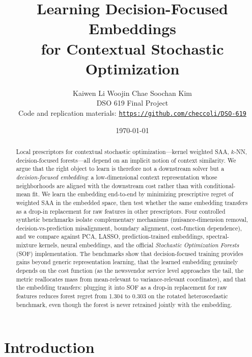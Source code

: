 \documentclass[11pt]{article}
\title{Learning Decision-Focused Embeddings\\for Contextual Stochastic Optimization}
\author{Kaiwen Li \quad Woojin Chae \quad Soochan Kim\\[4pt]
DSO 619 Final Project\\[2pt]
Code and replication materials: \href{https://github.com/checcoli/DSO-619}{\texttt{https://github.com/checcoli/DSO-619}}}
\date{\today}
\begin{document}
\maketitle

\begin{abstract}
Local prescriptors for contextual stochastic optimization---kernel weighted SAA, $k$-NN, decision-focused forests---all depend on an implicit notion of context similarity. We argue that the right object to learn is therefore not a downstream solver but a \emph{decision-focused embedding}: a low-dimensional context representation whose neighborhoods are aligned with the downstream cost rather than with conditional-mean fit. We learn the embedding end-to-end by minimizing prescriptive regret of weighted SAA in the embedded space, then test whether the same embedding transfers as a drop-in replacement for raw features in other prescriptors. Four controlled synthetic benchmarks isolate complementary mechanisms (nuisance-dimension removal, decision-vs-prediction misalignment, boundary alignment, cost-function dependence), and we compare against PCA, LASSO, prediction-trained embeddings, spectral-mixture kernels, neural embeddings, and the official \emph{Stochastic Optimization Forests} (SOF) implementation. The benchmarks show that decision-focused training provides gains beyond generic representation learning, that the learned embedding genuinely depends on the cost function (as the newsvendor service level approaches the tail, the metric reallocates mass from mean-relevant to variance-relevant coordinates), and that the embedding transfers: plugging it into SOF as a drop-in replacement for raw features reduces forest regret from 1.304 to 0.303 on the rotated heteroscedastic benchmark, even though the forest is never retrained jointly with the embedding.
\end{abstract}

\section{Introduction}\label{sec:intro}
\end{document}
